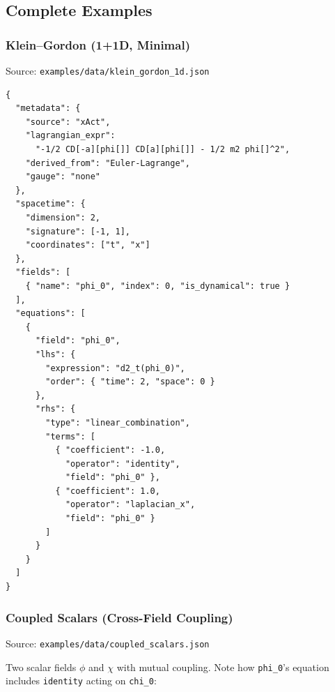 \subsection{Complete Examples}
\label{sec:json-examples}

\subsubsection{Klein--Gordon (1+1D, Minimal)}
\label{sec:json-example-kg}

Source: \texttt{examples/data/klein\_gordon\_1d.json}

\begin{lstlisting}[style=json]
{
  "metadata": {
    "source": "xAct",
    "lagrangian_expr":
      "-1/2 CD[-a][phi[]] CD[a][phi[]] - 1/2 m2 phi[]^2",
    "derived_from": "Euler-Lagrange",
    "gauge": "none"
  },
  "spacetime": {
    "dimension": 2,
    "signature": [-1, 1],
    "coordinates": ["t", "x"]
  },
  "fields": [
    { "name": "phi_0", "index": 0, "is_dynamical": true }
  ],
  "equations": [
    {
      "field": "phi_0",
      "lhs": {
        "expression": "d2_t(phi_0)",
        "order": { "time": 2, "space": 0 }
      },
      "rhs": {
        "type": "linear_combination",
        "terms": [
          { "coefficient": -1.0,
            "operator": "identity",
            "field": "phi_0" },
          { "coefficient": 1.0,
            "operator": "laplacian_x",
            "field": "phi_0" }
        ]
      }
    }
  ]
}
\end{lstlisting}

\subsubsection{Coupled Scalars (Cross-Field Coupling)}
\label{sec:json-example-coupled}

Source: \texttt{examples/data/coupled\_scalars.json}

Two scalar fields $\phi$ and $\chi$ with mutual coupling. Note how \texttt{phi\_0}'s equation includes \texttt{identity} acting on \texttt{chi\_0}:

